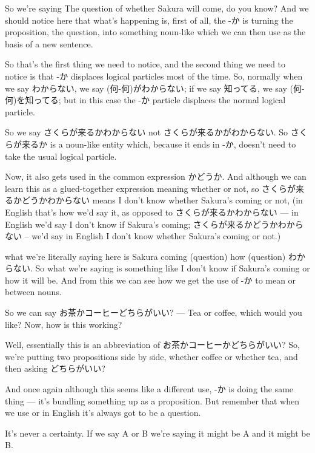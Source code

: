 So we're saying The question of whether Sakura will come, do you know? And we should notice here that what's happening is, first of all, the -か is turning the proposition, the question, into something noun-like which we can then use as the basis of a new sentence.

{}

So that's the first thing we need to notice, and the second thing we need to notice is that -か displaces logical particles most of the time. So, normally when we say わからない, we say (何-何)がわからない; if we say 知ってる, we say (何-何)を知ってる; but in this case the -か particle displaces the normal logical particle.

{}

So we say さくらが来るかわからない not さくらが来るかがわからない. So さくらが来るか is a noun-like entity which, because it ends in -か, doesn't need to take the usual logical particle.

\startsectionlevel[title={かどうか},reference={かどうか}]

Now, it also gets used in the common expression かどうか. And although we can learn this as a glued-together expression meaning whether or not, so さくらが来るかどうかわからない means I don't know whether Sakura's coming or not, (in English that's how we'd say it, as opposed to さくらが来るかわからない --- in English we'd say I don't know if Sakura's coming; さくらが来るかどうかわからない -- we'd say in English I don't know whether Sakura's coming or not.)

what we're literally saying here is Sakura coming (question) how (question) わからない. So what we're saying is something like I don't know if Sakura's coming or how it will be. And from this we can see how we get the use of -か to mean or between nouns.

So we can say お茶かコーヒーどちらがいい? --- Tea or coffee, which would you like? Now, how is this working?

Well, essentially this is an abbreviation of お茶かコーヒーかどちらがいい? So, we're putting two propositions side by side, whether coffee or whether tea, and then asking どちらがいい?

And once again although this seems like a different use, -か is doing the same thing --- it's bundling something up as a proposition. But remember that when we use or in English it's always got to be a question.

It's never a certainty. If we say A or B we're saying it might be A and it might be B.

